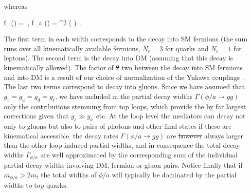 

whereas

\bea \label{eq:fphifa}
f_\phi (\tau) = \tau {}  \,, \qquad 
f_a (\tau) =  \tau \arctan^2 \left (  \right ) \,. 
\eea

The first term in each width corresponds to the decay into SM fermions (the sum runs over all kinematically available fermions, $N_c = 3$ for quarks and $N_c = 1$ for leptons). The second term is the decay into DM (assuming that this decay is kinematically allowed). The factor of \sout{2} two between the decay into SM  fermions and into DM  is a result of our choice of normalization of the Yukawa couplings . The last two terms correspond to decay into gluons.  Since we have assumed that $g_v = g_u = g_d = g_\ell$, we have included in the partial decay widths $\Gamma (\phi/a \to gg)$ only the contributions stemming from top loops, which provide the by far largest corrections given that $y_t \gg y_b$~etc. At the loop level the mediators can decay not only to gluons but also to pairs of photons and other final states if \sout{these are} kinematical accessible.  the decay rates $\Gamma (\phi/a \to gg)$ are \sout{however} always larger than the other loop-induced partial widths, and in consequence the total decay widths $\Gamma_{\phi/a}$ are well approximated by the corresponding sum of the individual partial decay widths involving DM, fermion or gluon pairs. \sout{Notice finally}  that if  $m_{\phi/a} > 2m_t$ the total widths of $\phi/a$ will typically be dominated by the partial widths to top quarks.
